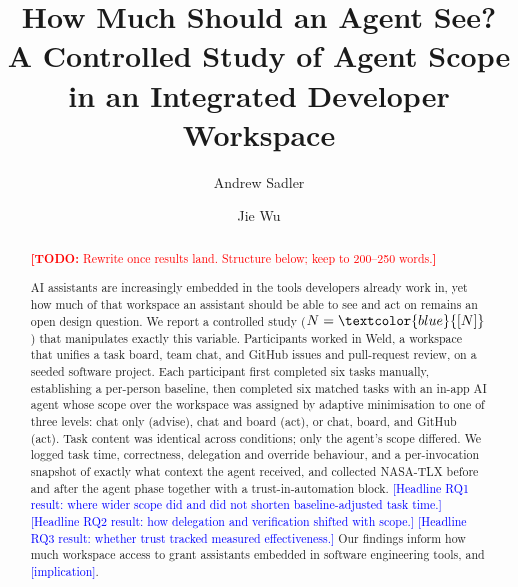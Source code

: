 \documentclass[acmsmall,review,screen]{acmart}
\newcommand{\todo}[1]{\textcolor{red}{\textbf{[TODO:} #1\textbf{]}}}
\newcommand{\NUM}[1]{\textcolor{blue}{[#1]}}          %
\begin{document}
\title{How Much Should an Agent See? A Controlled Study of Agent Scope
       in an Integrated Developer Workspace}

\author{Andrew Sadler}

\author{Jie Wu}

\renewcommand{\shortauthors}{Sadler and Wu}

\begin{abstract}
\todo{Rewrite once results land. Structure below; keep to 200--250 words.}

AI assistants are increasingly embedded in the tools developers already work
in, yet how much of that workspace an assistant should be able to see and act
on remains an open design question. We report a controlled study
($N=\NUM{N}$) that manipulates exactly this variable. Participants worked in
Weld, a workspace that unifies a task board, team chat, and GitHub issues and
pull-request review, on a seeded software project. Each participant first
completed six tasks manually, establishing a per-person baseline, then completed
six matched tasks with an in-app AI agent whose scope over the workspace was
assigned by adaptive minimisation to one of three levels: chat only (advise),
chat and board (act), or chat, board, and GitHub (act). Task content was
identical across conditions; only the agent's scope differed. We logged task
time, correctness,
delegation and override behaviour, and a per-invocation snapshot of exactly
what context the agent received, and collected NASA-TLX before and after the
agent phase together with a trust-in-automation block.
\NUM{Headline RQ1 result: where wider scope did and did not shorten
baseline-adjusted task time.}
\NUM{Headline RQ2 result: how delegation and verification shifted with scope.}
\NUM{Headline RQ3 result: whether trust tracked measured effectiveness.}
Our findings inform how much workspace access to grant assistants embedded in
software engineering tools, and \NUM{implication}.
\end{abstract}
\end{document}

